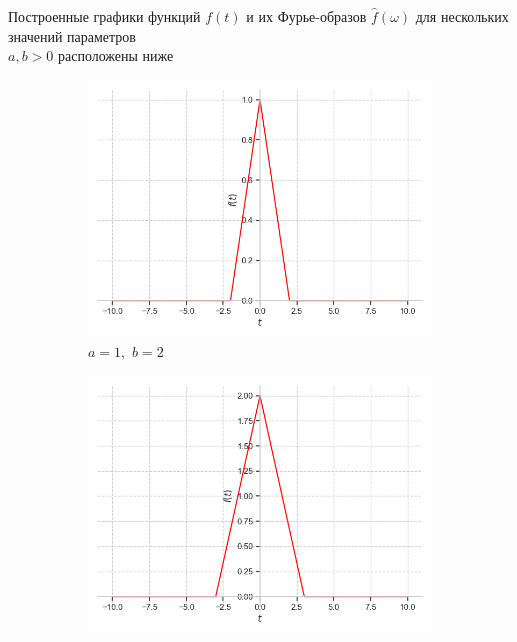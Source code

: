 \documentclass[a4paper, 16pt]{article}
\begin{document}
    \noindent Построенные графики функций $f(t)$ и их Фурье-образов
    $\hat{f}\left(\omega\right)$ для нескольких значений параметров\\ $a,b>0$ расположены ниже
    \begin{figure}[htbp]
        \centering
        \begin{subfigure}{0.3\textwidth}
            \centering
            \includegraphics[width=\linewidth]{trif_a=1_b=2.png}
            \caption{$a=1,\,\,b=2$}
            \label{fig:triangf_1}
        \end{subfigure}
        \hfill
        \begin{subfigure}{0.3\textwidth}
            \centering
            \includegraphics[width=\linewidth]{trif_a=2_b=3.png}

\end{subfigure}
\end{figure}
\end{document}
